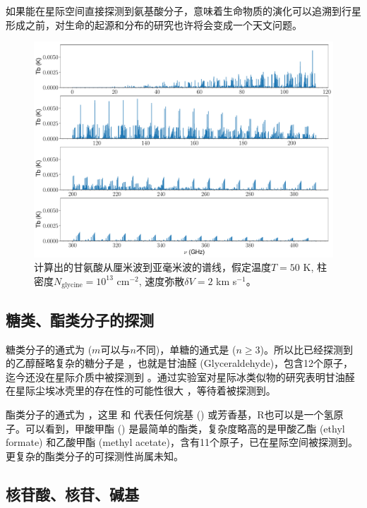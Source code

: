 \documentclass[a4paper]{article}
\begin{document}
如果能在星际空间直接探测到氨基酸分子，意味着生命物质的演化可以追溯到行星形成之前，对生命的起源和分布的研究也许将会变成一个天文问题。

\begin{figure}[htbp]
\centering
\includegraphics[width=0.95\linewidth]{glycine_50K_1e13_10e5_2e5.pdf}
\caption{计算出的甘氨酸从厘米波到亚毫米波的谱线，假定温度$T=50$ K, 柱密度$N_\text{glycine}=10^{13}$ cm$^{-2}$, 速度弥散$\delta V=2$ km s$^{-1}$。\label{figGlycine}}
\end{figure}

\subsection{糖类、酯类分子的探测}

糖类分子的通式为  ($m$可以与$n$不同)，单糖的通式是  ($n\ge3$)。所以比已经探测到的乙醇醛略复杂的糖分子是 ，也就是甘油醛 (Glyceraldehyde)，包含12个原子，迄今还没在星际介质中被探测到 \citep{Hollis2004}。通过实验室对星际冰类似物的研究表明甘油醛在星际尘埃冰壳里的存在性的可能性很大 \citep{deMarcellus2015}，等待着被探测到。

酯类分子的通式为 ，这里  和  代表任何烷基 () 或芳香基，R也可以是一个氢原子。可以看到，甲酸甲酯 () 是最简单的酯类，复杂度略高的是甲酸乙酯 (ethyl formate) 和乙酸甲酯 (methyl acetate)，含有11个原子，已在星际空间被探测到。更复杂的酯类分子的可探测性尚属未知。

\subsection{核苷酸、核苷、碱基}
\end{document}
